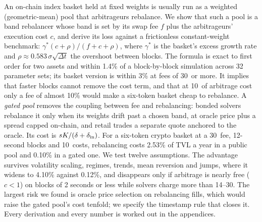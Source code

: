 \noindent An on-chain index basket held at fixed weights is usually run as a weighted (geometric-mean) pool that arbitrageurs rebalance. We show that such a pool is a band rebalancer whose band is set by its swap fee $f$ plus the arbitrageurs' execution cost $c$, and derive its loss against a frictionless constant-weight benchmark: $\gamma^{*}(c+\rho)/(f+c+\rho)$, where $\gamma^{*}$ is the basket's excess growth rate and $\rho\approx0.583\,\sigma\sqrt{\Delta t}$ the overshoot between blocks. The formula is exact to first order for two assets and within 1.4\% of a block-by-block simulation across 32 parameter sets; its basket version is within 3\% at fees of 30\bps\ or more. It implies that faster blocks cannot remove the cost term, and that at 10\bps\ of arbitrage cost only a fee of almost 10\% would make a six-token basket cheap to rebalance. A \emph{gated pool} removes the coupling between fee and rebalancing: bonded solvers rebalance it only when its weights drift past a chosen band, at oracle price plus a spread capped on-chain, and retail trades a separate quote anchored to the oracle. Its cost is $sK/(\delta+\delta_{\mathrm{in}})$. For a six-token crypto basket at a 30\bps\ fee, 12-second blocks and 10\bps\ costs, rebalancing costs 2.53\% of TVL a year in a public pool and 0.10\% in a gated one. We test twelve assumptions. The advantage survives volatility scaling, regimes, trends, mean reversion and jumps, where it widens to 4.10\% against 0.12\%, and disappears only if arbitrage is nearly free ($c<1$\bps) on blocks of 2 seconds or less while solvers charge more than 14--30\bps. The largest risk we found is oracle price selection on rebalancing fills, which would raise the gated pool's cost tenfold; we specify the timestamp rule that closes it. Every derivation and every number is worked out in the appendices.
